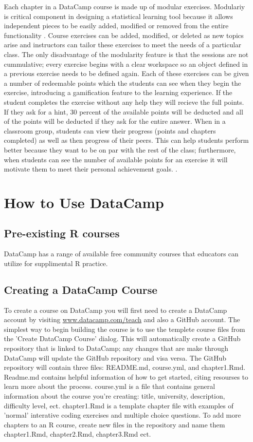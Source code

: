 \documentclass[12pt]{article}
\begin{document}
Each chapter in a DataCamp course is made up of modular exercises. Modulariy is critical component in designing a statistical
learning tool because it allows independent pieces to be easily added, modified or removed from the entire functionality
\cite{Hare2017}. Course exercises can be added, modified, or deleted as new topics arise and instructors can tailor
these exercises to meet the needs of a particular class. The only disadvantage of the modularity feature is that the sessions
are not cummulative; every exercise begins with a clear workspace so an object defined in a previous exercise needs to be
defined again. Each of these exercises can be given a number of redeemable points which the students can see when they begin
the exercise, introducing a gamification feature to the learning experience. If the student completes the exercise without
any help they will recieve the full points. If they ask for a hint, 30 percent of the available points will be deducted and
all of the points will be deducted if they ask for the entire answer. When in a classroom group, students can view their
progress (points and chapters completed) as well as then progress of their peers. This can help students perform better
because they want to be on par with the rest of the class; furthermore, when students can see the number of available points
for an exercise it will motivate them to meet their personal achievement goals. \citep{Chang2016}.


\section{How to Use DataCamp}

\subsection{Pre-existing R courses}
DataCamp has a range of available free community courses that educators can utilize for supplimental R practice.

\subsection{Creating a DataCamp Course}
To create a course on DataCamp you will first need to create a DataCamp account by visiting \url{www.datacamp.com/teach} and
also a GitHub account. The simplest way to begin building the course is to use the templete course files from the 'Create
DataCamp Course' dialog. This will automatically create a GitHub repository that is linked to DataCamp; any changes that are
make through DataCamp will update the GitHub repository and visa versa. The GitHub repository will contain three files:
README.md, course.yml, and chapter1.Rmd.
Readme.md contains helpful information of how to get started, citing resourses to learn more about the process.
course.yml is a file that contains general information about the course you're creating: title, university, description,
difficulty level, ect.
chapter1.Rmd is a template chapter file with examples of 'normal' interative coding exercises and multiple choice questions.
To add more chapters to an R course, create new files in the repository and name them chapter1.Rmd, chapter2.Rmd, chapter3.Rmd
ect.
\end{document}
